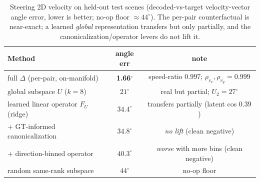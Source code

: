 \documentclass{article} %
\begin{document}
  \begin{table}[h]
  \caption{Steering 2D velocity on held-out test scenes (decoded-vs-target velocity-vector angle error,
  lower is better; no-op floor $\approx44^\circ$). The per-pair counterfactual is near-exact; a learned
  \emph{global} representation transfers but only partially, and the canonicalization/operator levers do
  not lift it.}
  \label{tab:vel2d}
  \begin{center}
  \begin{tabular}{lcc}
  \toprule
  \textbf{Method} & \textbf{angle err} & \textbf{note} \\
  \midrule
  full $\Delta$ (per-pair, on-manifold) & \textbf{1.66$^\circ$} & speed-ratio $0.997$; $\rho_{v_x},\rho_{v_y}=0.999$ \\
  global subspace $U$ ($k{=}8$)          & $21^\circ$ & real but partial; $U_2{=}27^\circ$ \\
  learned linear operator $F_U$ (ridge)  & $34.4^\circ$ & transfers partially (latent cos $0.39$) \\
  + GT-informed canonicalization         & $34.8^\circ$ & \emph{no lift} (clean negative) \\
  + direction-binned operator            & $40.3^\circ$ & \emph{worse} with more bins (clean negative) \\
  random same-rank subspace              & $44^\circ$ & no-op floor \\
  \bottomrule
  \end{tabular}
  \end{center}
  \end{table}
\end{document}
